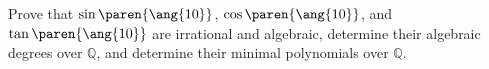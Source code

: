 Prove that
$\sin\paren{\ang{10}}$,
$\cos\paren{\ang{10}}$, and
$\tan\paren{\ang{10}}$
are irrational and algebraic,
determine their algebraic degrees over $\mathbb{Q}$,
and determine their minimal polynomials over $\mathbb{Q}$.
